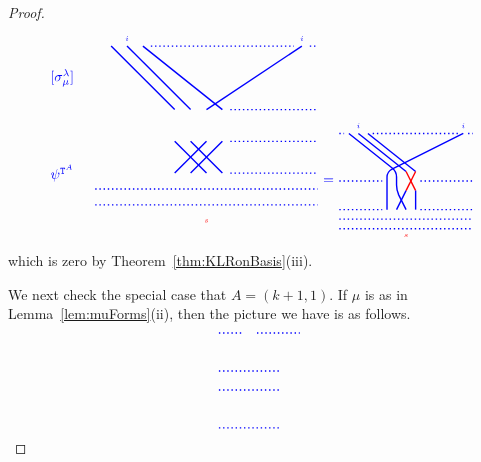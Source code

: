 \documentclass[twoside,11pt,reqno,letter]{amsart}
\numberwithin{equation}{section}
\theoremstyle{definition}  %
\newcommand{\0}{{\bar 0}}
\newcommand{\1}{{\bar 1}}
\newcommand{\la}{\lambda}
\newcommand{\si}{\sigma}
\def\T{{\mathtt T}}
\newenvironment{braid}{%
  \begin{tikzpicture}[baseline=6mm,blue,line width=1pt, scale=0.4,
                      draw/.append style={rounded corners},
                      every node/.append style={font=\tiny}]%
  }{\end{tikzpicture}
}
\begin{document}
{\begin{proof}
\[\begin{braid}
    \draw(1,10)--(5,6);
      \draw(5,4)--(7,2); \draw(7,-1)node[color=red]{$s$};
    \draw(2,10)node[above]{$i$}--(6,6);
      \draw(6,4)--(8,2);
    \draw(3,10)--(8,6);
      \draw(8,4)--(6,2);

    \draw[dotted](3.5,10)--(12.5,10);

    \draw(13,10)node[above]{$i$}--(7,6);
      \draw(7,4)--(5,2);

    \draw[dotted](13.5,10)--(14,10);
    \draw[dotted](8.5,6)--(14,6);
    \draw[dotted](8.5,4)--(14,4);
    \draw[dotted](8.5,2)--(14,2);

    \draw[dotted](0,1)--(14,1);
    \draw[dotted](0,0)--(14,0);

    \draw(-1,8)node[left,font=\normalsize]{$[\si^\la_\mu]$};
    \draw(-1,2)node[left,font=\normalsize]{$\psi^{\T^A}$};
  \end{braid}
  \begin{braid}\tikzset{scale=0.6,baseline=12mm}
    \draw(0,5)node[font=\normalsize]{$=$};
  \end{braid}
  \begin{braid}\tikzset{scale=0.6,baseline=12mm}
    \draw[dotted](0,10)--(0.5,10);
    \draw[dotted](0,5)--(4.5,5);
    \draw[dotted](0,2)--(4.5,2);

    \draw(1,10)--(6,6)--(6,4)--(7,2);
       \draw(7,0)node[below,color=red]{$s$};
    \draw(2,10)node[above]{$i$}--(7,6);
       \draw[color=red](7,6)--(8,4);
       \draw(8,4)--(8,2);
    \draw(3,10)--(8,6);
       \draw[color=red](8,6)--(7,4);
       \draw(7,4)--(6,2);

    \draw[dotted](3.5,10)--(12.5,10);

    \draw(13,10)node[above]{$i$}--(5,6)--(5,4)--(5,2);

    \draw[dotted](13.5,10)--(14,10);
    \draw[dotted](8.5,5)--(14,5);
    \draw[dotted](8.5,2)--(14,2);

    \draw[dotted](0,1)--(14,1);
    \draw[dotted](0,0)--(14,0);
  \end{braid}
\]
which is zero by Theorem~\ref{thm:KLRonBasis}(iii).




  We next check the special case that $A = (k+1, 1)$. If $\mu$ is as in Lemma~\ref{lem:muForms}(ii), then the picture we have is as follows.
\[
  \begin{braid}\tikzset{scale=0.6,baseline=12mm}
    \draw[dotted](0,10)--(2.5,10);
    \draw[dotted](4,10)--(8.5,10);
    \draw[dotted](0,6)--(6.5,6);
    \draw[dotted](0,4)--(6.5,4);
    \draw[dotted](0,0)--(6.5,0);


\end{braid}\]
\end{proof}}
\end{document}
